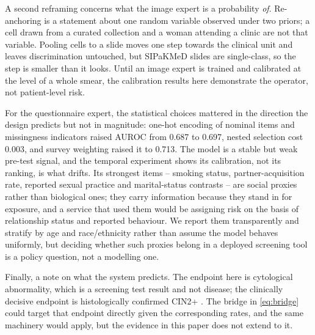 \documentclass[lettersize,journal]{IEEEtran}
\begin{document}
A second reframing concerns what the image expert is a probability \emph{of}. Re-anchoring is a statement about one random variable observed under two priors; a cell drawn from a curated collection and a woman attending a clinic are not that variable. Pooling cells to a slide moves one step towards the clinical unit and leaves discrimination untouched, but SIPaKMeD slides are single-class, so the step is smaller than it looks. Until an image expert is trained and calibrated at the level of a whole smear, the calibration results here demonstrate the operator, not patient-level risk.

For the questionnaire expert, the statistical choices mattered in the direction the design predicts but not in magnitude: one-hot encoding of nominal items and missingness indicators raised AUROC from 0.687 to 0.697, nested selection cost 0.003, and survey weighting raised it to 0.713. The model is a stable but weak pre-test signal, and the temporal experiment shows its calibration, not its ranking, is what drifts. Its strongest items -- smoking status, partner-acquisition rate, reported sexual practice and marital-status contrasts -- are social proxies rather than biological ones; they carry information because they stand in for exposure, and a service that used them would be assigning risk on the basis of relationship status and reported behaviour. We report them transparently and stratify by age and race/ethnicity rather than assume the model behaves uniformly, but deciding whether such proxies belong in a deployed screening tool is a policy question, not a modelling one.

Finally, a note on what the system predicts. The endpoint here is cytological abnormality, which is a screening test result and not disease; the clinically decisive endpoint is histologically confirmed CIN2+ \cite{wright2012athena}. The bridge in \eqref{eq:bridge} could target that endpoint directly given the corresponding rates, and the same machinery would apply, but the evidence in this paper does not extend to it.
\end{document}
